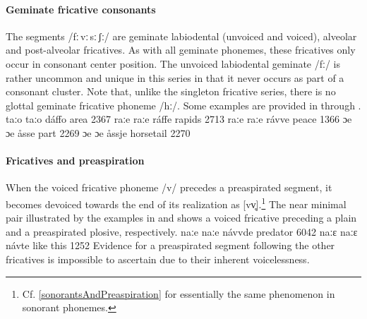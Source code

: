 \paragraph{Geminate fricative consonants}
The segments \mbox{/fː\,vː\,sː\,ʃː/} are geminate labiodental (unvoiced and voiced), alveolar and post-alveolar fricatives. As with all geminate phonemes, these fricatives only occur in consonant center position. The unvoiced labiodental geminate /fː/ is rather uncommon and unique in this series in that it never occurs as part of a consonant cluster. Note that, unlike the singleton fricative series, there is no glottal geminate fricative phoneme /hː/. Some examples are provided in  through .
	{taːo}	{taːo}	{dáffo}	{area\BS{}}		{2367}%
	{raːe}	{raːe}	{ráffe}	{rapids\BS{}}		{2713}%
	{raːe}	{raːe}	{rávve}	{peace\BS{}}		{1366}%
	{ɔe}	{ɔe}	{åsse}	{part\BS{}}	{2269}
	{ɔe}	{ɔe}	{åssje}	{horsetail\BS{}}	{2270}


\paragraph{Fricatives and preaspiration}\label{fricativesAndPreaspiration}
When the voiced fricative phoneme /v/ precedes a preaspirated segment, it becomes devoiced towards the end of its realization as [vv̥].\footnote{Cf. \SEC\ref{sonorantsAndPreaspiration} for essentially the same phenomenon in sonorant phonemes.} 
The near minimal pair illustrated by the examples in  and  shows a voiced fricative preceding a plain and a preaspirated plosive, respectively.
	{naːe}	{naːe}	{návvde}	{predator\BS{}}		{6042}%
		{naːɛ}	{naːɛ}	{návte}	{like this}		{1252}%
Evidence for a preaspirated segment following the other fricatives is impossible to ascertain due to their inherent voicelessness.


